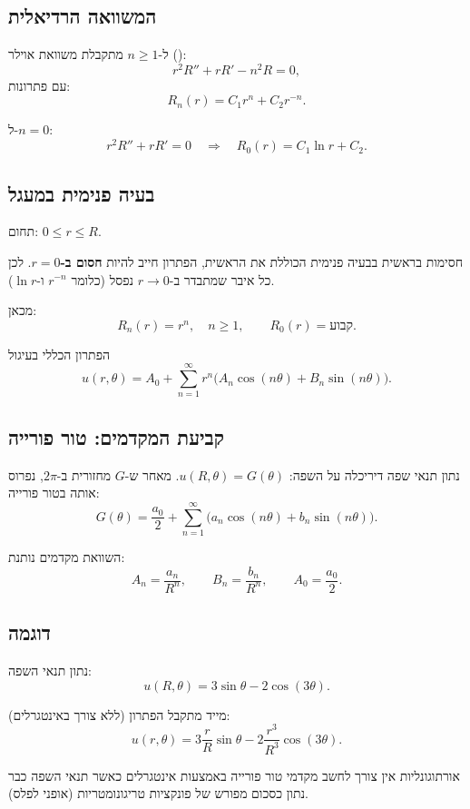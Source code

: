 \subsection{המשוואה הרדיאלית}
ל-\(n\ge1\) מתקבלת משוואת אוילר ():
\[
r^2 R'' + r R' - n^2 R = 0,
\]
עם פתרונות:
\[
R_n(r)=C_1 r^n + C_2 r^{-n}.
\]

ל-\(n=0\):
\[
r^2 R'' + r R' = 0
\quad\Rightarrow\quad
R_0(r)=C_1 \ln r + C_2.
\]

\subsection{בעיה פנימית במעגל}
תחום: \(0\le r\le R\).

\begin{notebox}{חסימות בראשית}
בבעיה פנימית הכוללת את הראשית, הפתרון חייב להיות \textbf{חסום ב-\(r=0\)}.
לכן כל איבר שמתבדר ב-\(r\to0\) נפסל (כלומר \(r^{-n}\) ו-\(\ln r\)).
\end{notebox}

מכאן:
\[
R_n(r)=r^n,\quad n\ge1,
\qquad
R_0(r)=\text{קבוע}.
\]

\begin{resultbox}{הפתרון הכללי בעיגול}
\[
u(r,\theta)=
A_0
+\sum_{n=1}^\infty
r^n\bigl(
A_n\cos(n\theta)+B_n\sin(n\theta)
\bigr).
\]
\end{resultbox}

\subsection{קביעת המקדמים: טור פורייה}
נתון תנאי שפה דיריכלה על השפה: \(u(R,\theta)=G(\theta)\).
מאחר ש-\(G\) מחזורית ב-\(2\pi\), נפרוס אותה בטור פורייה:
\[
G(\theta)=
\frac{a_0}{2}
+\sum_{n=1}^\infty
\bigl(
a_n\cos(n\theta)+b_n\sin(n\theta)
\bigr).
\]

השוואת מקדמים נותנת:
\[
A_n=\frac{a_n}{R^n},
\qquad
B_n=\frac{b_n}{R^n},
\qquad
A_0=\frac{a_0}{2}.
\]

\subsection{דוגמה}
נתון תנאי השפה:
\[
u(R,\theta)=
3\sin\theta -2\cos(3\theta).
\]

מייד מתקבל הפתרון (ללא צורך באינטגרלים):
\[
u(r,\theta)=
3\frac{r}{R}\sin\theta
-2\frac{r^3}{R^3}\cos(3\theta).
\]

\begin{examplebox}{אורתוגונליות}
אין צורך לחשב מקדמי טור פורייה באמצעות אינטגרלים כאשר תנאי השפה כבר נתון כסכום מפורש של פונקציות טריגונומטריות (אופני לפלס).
\end{examplebox}

